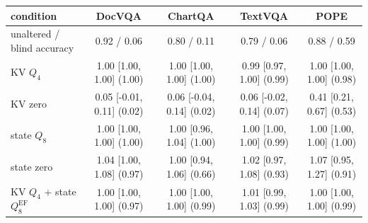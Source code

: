 \begin{tabular}{lcccc}
\toprule
condition & DocVQA & ChartQA & TextVQA & POPE \\
\midrule
unaltered / blind accuracy & 0.92 / 0.06 & 0.80 / 0.11 & 0.79 / 0.06 & 0.88 / 0.59 \\
\midrule
KV $Q_4$ & 1.00 {\scriptsize[1.00, 1.00]} (1.00) & 1.00 {\scriptsize[1.00, 1.00]} (1.00) & 0.99 {\scriptsize[0.97, 1.00]} (0.99) & 1.00 {\scriptsize[1.00, 1.00]} (0.98) \\
KV zero & 0.05 {\scriptsize[-0.01, 0.11]} (0.02) & 0.06 {\scriptsize[-0.04, 0.14]} (0.02) & 0.06 {\scriptsize[-0.02, 0.14]} (0.07) & 0.41 {\scriptsize[0.21, 0.67]} (0.53) \\
state $Q_8$ & 1.00 {\scriptsize[1.00, 1.00]} (1.00) & 1.00 {\scriptsize[0.96, 1.04]} (1.00) & 1.00 {\scriptsize[1.00, 1.00]} (0.99) & 1.00 {\scriptsize[1.00, 1.00]} (1.00) \\
state zero & 1.04 {\scriptsize[1.00, 1.08]} (0.97) & 1.00 {\scriptsize[0.94, 1.06]} (0.66) & 1.02 {\scriptsize[0.97, 1.08]} (0.93) & 1.07 {\scriptsize[0.95, 1.27]} (0.91) \\
KV $Q_4$ + state $Q_8^{\mathrm{EF}}$ & 1.00 {\scriptsize[1.00, 1.00]} (0.97) & 1.00 {\scriptsize[1.00, 1.00]} (0.99) & 1.01 {\scriptsize[0.99, 1.03]} (0.99) & 1.00 {\scriptsize[1.00, 1.00]} (0.99) \\
\bottomrule
\end{tabular}
